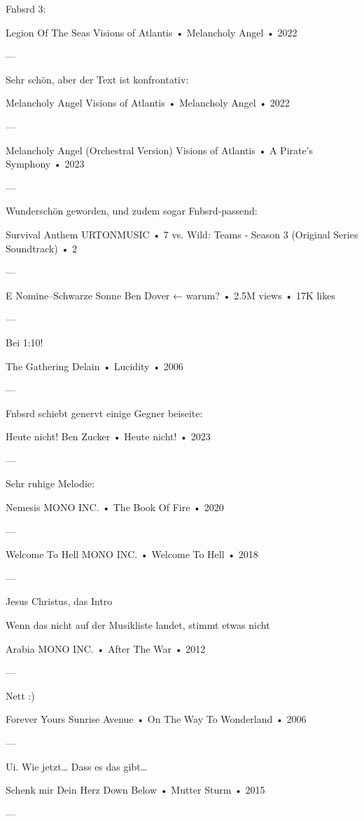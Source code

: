 Fnbsrd 3:

Legion Of The Seas
Visions of Atlantis
 •
Melancholy Angel
 •
2022


—

Sehr schön, aber der Text ist konfrontativ:

Melancholy Angel
Visions of Atlantis
 •
Melancholy Angel
 •
2022

—

Melancholy Angel (Orchestral Version)
Visions of Atlantis
 •
A Pirate's Symphony
 •
2023


—

Wunderschön geworden, und zudem sogar Fnbsrd-passend:

Survival Anthem
URTONMUSIC
 •
7 vs. Wild: Teams - Season 3 (Original Series Soundtrack)
 •
2


—

E Nomine--Schwarze Sonne
Ben Dover   ← warum?
 •
2.5M views
 •
17K likes


—

Bei 1:10!

The Gathering
Delain
 •
Lucidity
 •
2006


—

Fnbsrd schiebt genervt einige Gegner beiseite:

Heute nicht!
Ben Zucker
 •
Heute nicht!
 •
2023



—


Sehr ruhige Melodie:

Nemesis
MONO INC.
 •
The Book Of Fire
 •
2020


—

Welcome To Hell
MONO INC.
 •
Welcome To Hell
 •
2018



—

Jesus Christus, das Intro

Wenn das nicht auf der Musikliste landet, stimmt etwas nicht

Arabia
MONO INC.
 •
After The War
 •
2012




—

Nett :)

Forever Yours
Sunrise Avenue
 •
On The Way To Wonderland
 •
2006


—

Ui. Wie jetzt… Dass es das gibt…

Schenk mir Dein Herz
Down Below
 •
Mutter Sturm
 •
2015


—

